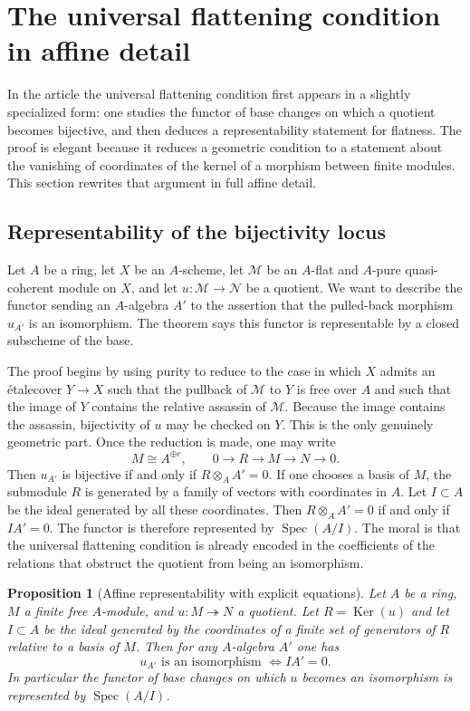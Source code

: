 \documentclass[11pt,oneside]{article}
\newtheorem{proposition}[theorem]{Proposition}
\newcommand{\M}{\mathcal M}
\newcommand{\N}{\mathcal N}
\newcommand{\Spec}{\operatorname{Spec}}
\newcommand{\Ker}{\operatorname{Ker}}
\newcommand{\etale}{\'etale}
\begin{document}
\section{The universal flattening condition in affine detail}

In the article the universal flattening condition first appears in a slightly specialized form: one studies the functor of base changes on which a quotient becomes bijective, and then deduces a representability statement for flatness.  The proof is elegant because it reduces a geometric condition to a statement about the vanishing of coordinates of the kernel of a morphism between finite modules.  This section rewrites that argument in full affine detail.

\subsection{Representability of the bijectivity locus}

Let $A$ be a ring, let $X$ be an $A$-scheme, let $\M$ be an $A$-flat and $A$-pure quasi-coherent module on $X$, and let $u\colon \M\to \N$ be a quotient.  We want to describe the functor sending an $A$-algebra $A'$ to the assertion that the pulled-back morphism $u_{A'}$ is an isomorphism.  The theorem says this functor is representable by a closed subscheme of the base.

The proof begins by using purity to reduce to the case in which $X$ admits an \etale cover $Y\to X$ such that the pullback of $\M$ to $Y$ is free over $A$ and such that the image of $Y$ contains the relative assassin of $\M$.  Because the image contains the assassin, bijectivity of $u$ may be checked on $Y$.  This is the only genuinely geometric part.  Once the reduction is made, one may write
\[
M\cong A^{\oplus r},\qquad 0\to R\to M\to N\to 0.
\]
Then $u_{A'}$ is bijective if and only if $R\otimes_A A'=0$.  If one chooses a basis of $M$, the submodule $R$ is generated by a family of vectors with coordinates in $A$.  Let $I\subset A$ be the ideal generated by all these coordinates.  Then $R\otimes_A A'=0$ if and only if $I A'=0$.  The functor is therefore represented by $\Spec(A/I)$.  The moral is that the universal flattening condition is already encoded in the coefficients of the relations that obstruct the quotient from being an isomorphism.

\begin{proposition}[Affine representability with explicit equations]\label{prop:affine-representability-long}
Let $A$ be a ring, $M$ a finite free $A$-module, and $u\colon M\twoheadrightarrow N$ a quotient.  Let $R=\Ker(u)$ and let $I\subset A$ be the ideal generated by the coordinates of a finite set of generators of $R$ relative to a basis of $M$.  Then for any $A$-algebra $A'$ one has
\[
u_{A'}\text{ is an isomorphism }\Longleftrightarrow I A'=0.
\]
In particular the functor of base changes on which $u$ becomes an isomorphism is represented by $\Spec(A/I)$.
\end{proposition}
\end{document}
